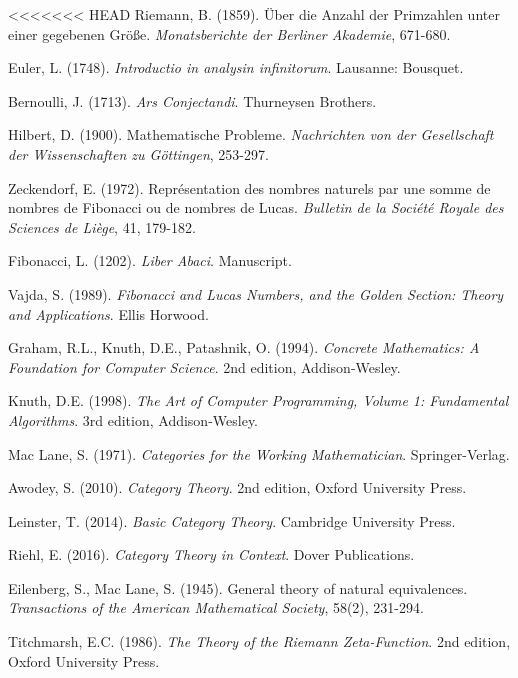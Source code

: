 \documentclass[12pt]{article}
\theoremstyle{plain}
\theoremstyle{definition}
\begin{document}
\begin{thebibliography}{99}

<<<<<<< HEAD
 Riemann, B. (1859). Über die Anzahl der Primzahlen unter einer gegebenen Größe. \emph{Monatsberichte der Berliner Akademie}, 671-680.

 Euler, L. (1748). \emph{Introductio in analysin infinitorum}. Lausanne: Bousquet.

 Bernoulli, J. (1713). \emph{Ars Conjectandi}. Thurneysen Brothers.

 Hilbert, D. (1900). Mathematische Probleme. \emph{Nachrichten von der Gesellschaft der Wissenschaften zu Göttingen}, 253-297.

 Zeckendorf, E. (1972). Représentation des nombres naturels par une somme de nombres de Fibonacci ou de nombres de Lucas. \emph{Bulletin de la Société Royale des Sciences de Liège}, 41, 179-182.

 Fibonacci, L. (1202). \emph{Liber Abaci}. Manuscript.

 Vajda, S. (1989). \emph{Fibonacci and Lucas Numbers, and the Golden Section: Theory and Applications}. Ellis Horwood.

 Graham, R.L., Knuth, D.E., Patashnik, O. (1994). \emph{Concrete Mathematics: A Foundation for Computer Science}. 2nd edition, Addison-Wesley.

 Knuth, D.E. (1998). \emph{The Art of Computer Programming, Volume 1: Fundamental Algorithms}. 3rd edition, Addison-Wesley.

 Mac Lane, S. (1971). \emph{Categories for the Working Mathematician}. Springer-Verlag.

 Awodey, S. (2010). \emph{Category Theory}. 2nd edition, Oxford University Press.

 Leinster, T. (2014). \emph{Basic Category Theory}. Cambridge University Press.

 Riehl, E. (2016). \emph{Category Theory in Context}. Dover Publications.

 Eilenberg, S., Mac Lane, S. (1945). General theory of natural equivalences. \emph{Transactions of the American Mathematical Society}, 58(2), 231-294.

 Titchmarsh, E.C. (1986). \emph{The Theory of the Riemann Zeta-Function}. 2nd edition, Oxford University Press.


\end{thebibliography}
\end{document}
